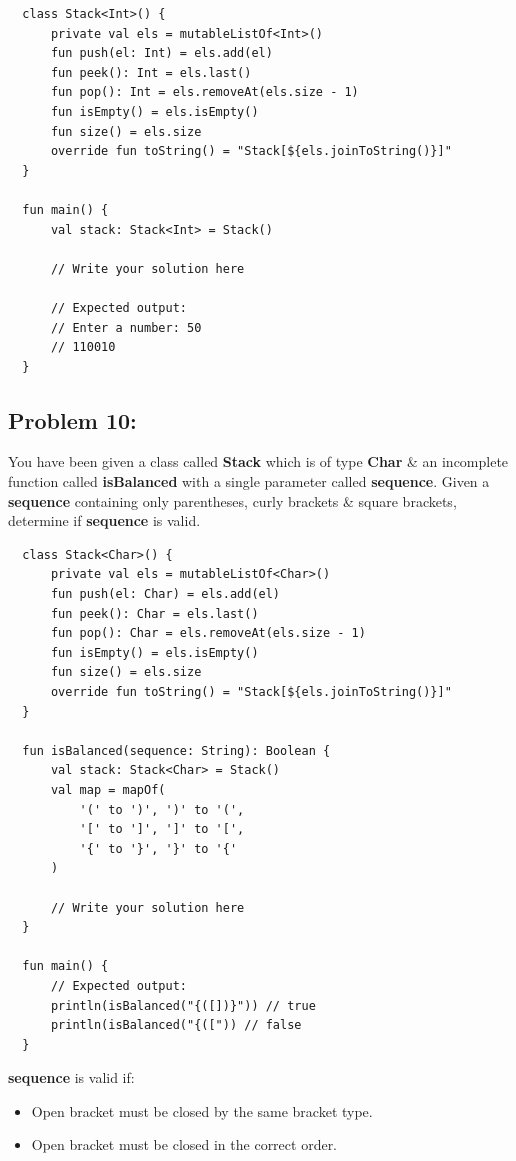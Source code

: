 \documentclass{article}
\begin{document}
\begin{verbatim}
  class Stack<Int>() {
      private val els = mutableListOf<Int>()
      fun push(el: Int) = els.add(el)
      fun peek(): Int = els.last()
      fun pop(): Int = els.removeAt(els.size - 1)
      fun isEmpty() = els.isEmpty()
      fun size() = els.size
      override fun toString() = "Stack[${els.joinToString()}]"
  }

  fun main() {
      val stack: Stack<Int> = Stack()

      // Write your solution here

      // Expected output:
      // Enter a number: 50
      // 110010
  }
\end{verbatim}

\subsection*{Problem 10:}
You have been given a class called \textbf{Stack} which is of type \textbf{Char} \& an incomplete function called \textbf{isBalanced} with a single parameter called \textbf{sequence}. Given a \textbf{sequence} containing only parentheses, curly brackets \& square brackets, determine if \textbf{sequence} is valid.

\begin{verbatim}
  class Stack<Char>() {
      private val els = mutableListOf<Char>()
      fun push(el: Char) = els.add(el)
      fun peek(): Char = els.last()
      fun pop(): Char = els.removeAt(els.size - 1)
      fun isEmpty() = els.isEmpty()
      fun size() = els.size
      override fun toString() = "Stack[${els.joinToString()}]"
  }

  fun isBalanced(sequence: String): Boolean {
      val stack: Stack<Char> = Stack()
      val map = mapOf(
          '(' to ')', ')' to '(',
          '[' to ']', ']' to '[',
          '{' to '}', '}' to '{'
      )
      
      // Write your solution here
  }

  fun main() {
      // Expected output:
      println(isBalanced("{([])}")) // true
      println(isBalanced("{([")) // false
  }
\end{verbatim}

\textbf{sequence} is valid if:
\begin{itemize}
  \item Open bracket must be closed by the same bracket type.
  \item Open bracket must be closed in the correct order.
\end{itemize}
\end{document}
